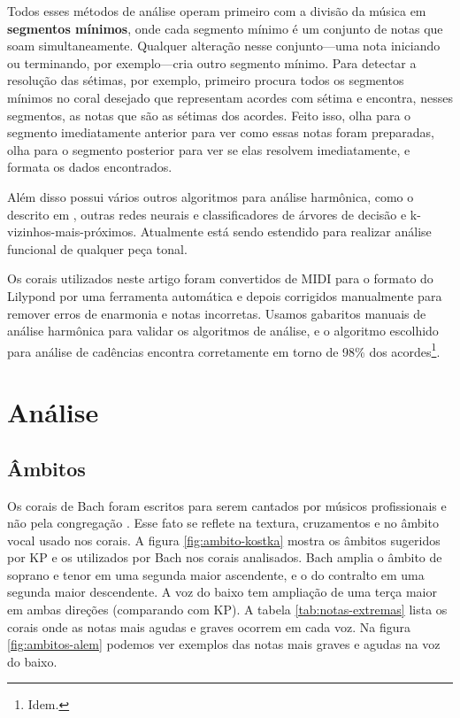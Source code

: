 Todos esses métodos de análise operam primeiro com a divisão da música
em \textbf{segmentos mínimos}, onde cada segmento mínimo é um conjunto
de notas que soam simultaneamente. Qualquer alteração nesse
conjunto---uma nota iniciando ou terminando, por exemplo---cria outro
segmento mínimo. Para detectar a resolução das sétimas, por exemplo,
\rameau{} primeiro procura todos os segmentos mínimos no coral
desejado que representam acordes com sétima e encontra, nesses
segmentos, as notas que são as sétimas dos acordes. Feito isso,
\rameau{} olha para o segmento imediatamente anterior para ver como
essas notas foram preparadas, olha para o segmento posterior para ver
se elas resolvem imediatamente, e formata os dados encontrados.

Além disso \rameau{} possui vários outros algoritmos para análise
harmônica, como o descrito em \cite{pardo.ea00:automated}, outras
redes neurais e classificadores de árvores de decisão e
k-vizinhos-mais-próximos. Atualmente \rameau{} está sendo estendido
para realizar análise funcional de qualquer peça tonal.

Os corais utilizados neste artigo foram convertidos de MIDI para o
formato do Lilypond por uma ferramenta automática e depois corrigidos
manualmente para remover erros de enarmonia e notas incorretas. Usamos
gabaritos manuais de análise harmônica para validar os algoritmos de
análise, e o algoritmo escolhido para análise de cadências encontra
corretamente em torno de 98\% dos acordes\footnote{Idem.}.

\section{Análise}
\label{sec:analise}

\subsection{Âmbitos}
\label{sec:ambitos}

Os corais de Bach foram escritos para serem cantados por músicos
profissionais e não pela congregação \cite{bach41:371}. Esse fato se
reflete na textura, cruzamentos e no âmbito vocal usado nos corais. A
figura \ref{fig:ambito-kostka} mostra os âmbitos sugeridos por KP e os
utilizados por Bach nos corais analisados. Bach amplia o âmbito de
soprano e tenor em uma segunda maior ascendente, e o do contralto em
uma segunda maior descendente. A voz do baixo tem ampliação de uma
terça maior em ambas direções (comparando com KP). A tabela
\ref{tab:notas-extremas} lista os corais onde as notas mais agudas e
graves ocorrem em cada voz. Na figura \ref{fig:ambitos-alem} podemos
ver exemplos das notas mais graves e agudas na voz do baixo.

